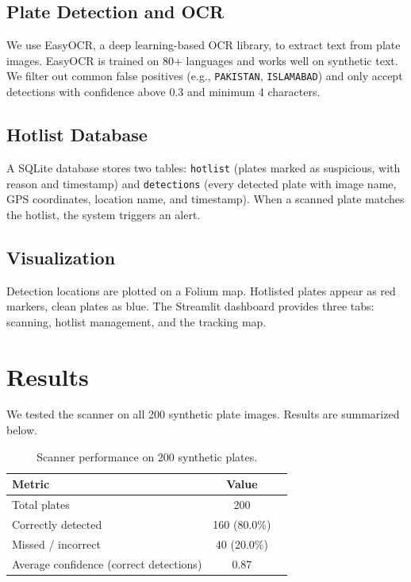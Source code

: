 \documentclass[11pt,a4paper]{article}
\begin{document}
\subsection{Plate Detection and OCR}

We use EasyOCR, a deep learning-based OCR library, to extract text from plate images. EasyOCR is trained on 80+ languages and works well on synthetic text. We filter out common false positives (e.g., \texttt{PAKISTAN}, \texttt{ISLAMABAD}) and only accept detections with confidence above 0.3 and minimum 4 characters.

\subsection{Hotlist Database}

A SQLite database stores two tables: \texttt{hotlist} (plates marked as suspicious, with reason and timestamp) and \texttt{detections} (every detected plate with image name, GPS coordinates, location name, and timestamp). When a scanned plate matches the hotlist, the system triggers an alert.

\subsection{Visualization}

Detection locations are plotted on a Folium map. Hotlisted plates appear as red markers, clean plates as blue. The Streamlit dashboard provides three tabs: scanning, hotlist management, and the tracking map.

\section{Results}

We tested the scanner on all 200 synthetic plate images. Results are summarized below.

\begin{table}[h]
\centering
\caption{Scanner performance on 200 synthetic plates.}
\label{tab:results}
\begin{tabular}{@{}lcc@{}}
\toprule
Metric & Value \\
\midrule
Total plates & 200 \\
Correctly detected & 160 (80.0\%) \\
Missed / incorrect & 40 (20.0\%) \\
Average confidence (correct detections) & 0.87 \\
\bottomrule
\end{tabular}
\end{table}
\end{document}
